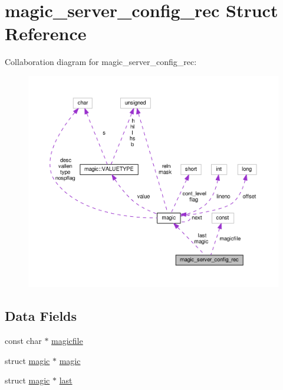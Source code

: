\hypertarget{structmagic__server__config__rec}{}\section{magic\+\_\+server\+\_\+config\+\_\+rec Struct Reference}
\label{structmagic__server__config__rec}


Collaboration diagram for magic\+\_\+server\+\_\+config\+\_\+rec\+:
\nopagebreak
\begin{figure}[H]
\begin{center}
\leavevmode
\includegraphics[width=350pt]{structmagic__server__config__rec__coll__graph}
\end{center}
\end{figure}
\subsection*{Data Fields}
\begin{DoxyCompactItemize}
\item 
const char $\ast$ \hyperlink{structmagic__server__config__rec_aa171b9ab9cac8a5c788f03dc72d5789a}{magicfile}
\item 
struct \hyperlink{structmagic}{magic} $\ast$ \hyperlink{structmagic__server__config__rec_a472fdd35bf67ceea2a81085c5d29b05e}{magic}
\item 
struct \hyperlink{structmagic}{magic} $\ast$ \hyperlink{structmagic__server__config__rec_a7bdc6bbfc5d0f45adda8d2c72755121a}{last}
\end{DoxyCompactItemize}



